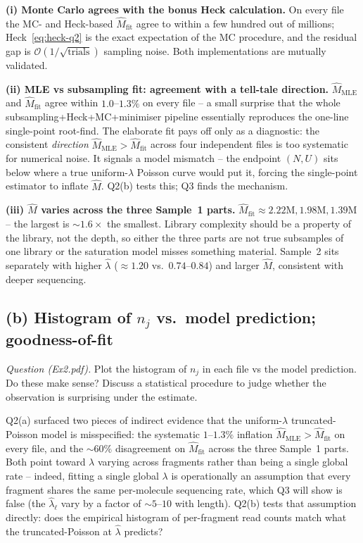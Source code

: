 \documentclass[11pt,a4paper]{article}
\newcommand{\hlam}{\hat{\lambda}}
\newcommand{\hM}{\hat{M}}
\begin{document}
\textbf{(i) Monte Carlo agrees with the bonus Heck calculation.}
On every file the MC- and Heck-based $\hM_{\text{fit}}$ agree to within a few
hundred out of millions; Heck~\eqref{eq:heck-q2} is the exact expectation of
the MC procedure, and the residual gap is $\mathcal{O}(1/\sqrt{\text{trials}})$
sampling noise. Both implementations are mutually validated.

\textbf{(ii) MLE vs subsampling fit: agreement with a tell-tale direction.}
$\hM_{\text{MLE}}$ and $\hM_{\text{fit}}$ agree within $1.0$--$1.3\%$ on every
file -- a small surprise that the whole subsampling+Heck+MC+minimiser pipeline
essentially reproduces the one-line single-point root-find. The elaborate fit
pays off only as a diagnostic: the consistent \emph{direction} $\hM_{\text{MLE}}
> \hM_{\text{fit}}$ across four independent files is too systematic for
numerical noise. It signals a model mismatch -- the endpoint $(N,U)$ sits below
where a true uniform-$\lambda$ Poisson curve would put it, forcing the
single-point estimator to inflate $\hM$. Q2(b) tests this; Q3 finds the mechanism.

\textbf{(iii) $\hM$ varies across the three Sample~1 parts.}
$\hM_{\text{fit}} \approx 2.22\text{M}, 1.98\text{M}, 1.39\text{M}$ -- the
largest is $\sim 1.6\times$ the smallest. Library complexity should be a
property of the library, not the depth, so either the three parts are not true
subsamples of one library or the saturation model misses something material.
Sample~2 sits separately with higher $\hlam$ ($\approx 1.20$ vs.\ $0.74$--$0.84$)
and larger $\hM$, consistent with deeper sequencing.

\subsection{(b) Histogram of $n_j$ vs.\ model prediction; goodness-of-fit}
\emph{Question (Ex2.pdf).} Plot the histogram of $n_j$ in each file vs the
model prediction. Do these make sense? Discuss a statistical procedure to
judge whether the observation is surprising under the estimate.

Q2(a) surfaced two pieces of indirect evidence that the uniform-$\lambda$
truncated-Poisson model is misspecified: the systematic $1$--$1.3\%$ inflation
$\hM_{\text{MLE}} > \hM_{\text{fit}}$ on every file, and the $\sim 60\%$ disagreement
on $\hM_{\text{fit}}$ across the three Sample~1 parts. Both point toward
$\lambda$ varying across fragments rather than being a single global rate --
indeed, fitting a single global $\lambda$ is operationally an assumption that
every fragment shares the same per-molecule sequencing rate, which Q3 will show
is false (the $\hlam_\ell$ vary by a factor of $\sim 5$--$10$ with length).
Q2(b) tests that assumption directly: does the empirical histogram of
per-fragment read counts match what the truncated-Poisson at $\hlam$ predicts?
\end{document}

